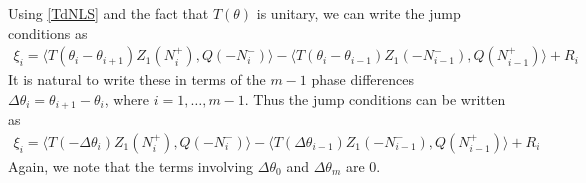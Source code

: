 \documentclass[12pt]{article}
\begin{document}
Using \eqref{TdNLS} and the fact that $T(\theta)$ is unitary, we can write the jump conditions as
\begin{align*}
\xi_i = \langle T(\theta_i - \theta_{i+1}) Z_1(N_i^+), Q(-N_i^-) \rangle
- \langle T(\theta_i - \theta_{i-1}) Z_1(-N_{i-1}^-), Q(N_{i-1}^+) \rangle + R_i
\end{align*}
It is natural to write these in terms of the $m-1$ phase differences $\Delta \theta_i = \theta_{i+1} - \theta_i$, where $i = 1, \dots, m-1$. Thus the jump conditions can be written as
\begin{align}\label{jumpDNLS}
\xi_i = \langle T(-\Delta \theta_i) Z_1(N_i^+), Q(-N_i^-) \rangle
- \langle T(\Delta \theta_{i-1}) Z_1(-N_{i-1}^-), Q(N_{i-1}^+) \rangle + R_i
\end{align}
Again, we note that the terms involving $\Delta \theta_0$ and $\Delta \theta_m$ are 0.
\end{document}
